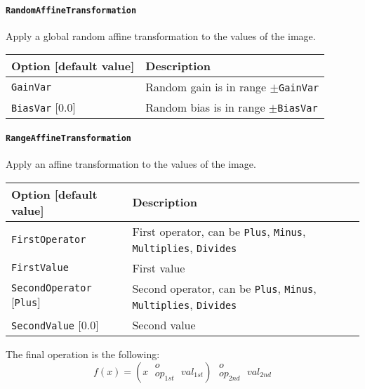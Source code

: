 \documentclass[a4paper,11pt,oneside]{article}
\newcommand{\iponly}{\reversemarginpar
    \marginnote{\color{listletiblue}\normalfont\scriptsize
    {\ttfamily{}\hyperref[sec:N2D2-IP]{\color{listletiblue}N2D2 IP}} \emph{only}}}
\begin{document}
\paragraph{\texorpdfstring{%
\lstinline[basicstyle=\ttfamily\bfseries]!RandomAffineTransformation!%
\protect\iponly}{RandomAffineTransformation}}
Apply a global random affine transformation to the values of the image.

\begin{center}
 \begin{tabular}{| p{5cm} | p{10cm} | }
 \hline
 Option [default value] & Description\\
 \hline\hline
  \cellcolor{requiredcolor}\lstinline!GainVar! & Random gain is in range $\pm$\lstinline!GainVar! \\
  \lstinline!BiasVar! [0.0] & Random bias is in range $\pm$\lstinline!BiasVar!\\
 \hline
\end{tabular}
\end{center}


\paragraph{\texorpdfstring{%
\lstinline[basicstyle=\ttfamily\bfseries]!RangeAffineTransformation!}
{RangeAffineTransformation}}
Apply an affine transformation to the values of the image.

\begin{center}
 \begin{tabular}{| p{5cm} | p{10cm} | }
 \hline
 Option [default value] & Description\\
 \hline\hline
  \cellcolor{requiredcolor}\lstinline!FirstOperator! & First operator, can be
   \lstinline!Plus!, \lstinline!Minus!, \lstinline!Multiplies!,
   \lstinline!Divides!  \\
  \cellcolor{requiredcolor}\lstinline!FirstValue! & First value \\
  \lstinline!SecondOperator! [\lstinline!Plus!] & Second operator, can be
  \lstinline!Plus!, \lstinline!Minus!, \lstinline!Multiplies!,
  \lstinline!Divides!  \\
  \lstinline!SecondValue! [0.0] & Second value \\
 \hline
\end{tabular}
\end{center}

The final operation is the following:
\[f(x) = \left(x\;\substack{o\\op_{1st}}\;val_{1st}\right)\;
\substack{o\\op_{2nd}}\;val_{2nd}\]
\end{document}
